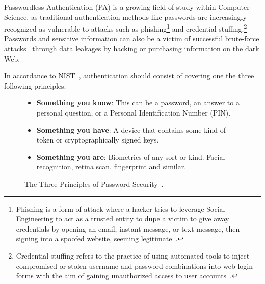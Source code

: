 Passwordless Authentication (PA) is a growing field of study within Computer
Science, as traditional authentication methods like passwords are increasingly
recognized as vulnerable to attacks such as phishing\footnote{
  Phishing is a form of attack where a hacker tries to leverage Social
  Engineering to act as a trusted entity to dupe a victim to give away
  credentials by opening an email, instant message, or text message, then
  signing into a spoofed website, seeming legitimate~\cite{ripa2021emergence}.
} and credential stuffing.\footnote{
  Credential stuffing refers to the practice of using automated tools to
  inject compromised or stolen username and password combinations into web login
  forms with the aim of gaining unauthorized access to user
  accounts~\cite{owasp-credential-stuffing}.
}
Passwords and sensitive information can also be a victim of successful
brute-force attacks~\cite{bonneau2012science} through data leakages by hacking
or purchasing information on the dark Web.

In accordance to NIST~\cite{NIST:SP:800-171r2, NISTSP800-63-3}, authentication
should consist of covering one the three following principles:

\begin{figure}[htbp]
  \begin{itemize}
    \item \textbf{Something you know}:
      This can be a password, an answer to a personal question, or a Personal
      Identification Number (PIN).
    \item \textbf{Something you have}:
      A device that contains some kind of token or cryptographically signed keys.
    \item \textbf{Something you are}:
      Biometrics of any sort or kind.
    Facial recognition, retina scan, fingerprint and similar.
  \end{itemize}
  \caption{The Three Principles of Password Security~\cite{schneier2000secrets, NIST:SP:800-171r2}.}
  \label{fig:secprinciples}
\end{figure}

